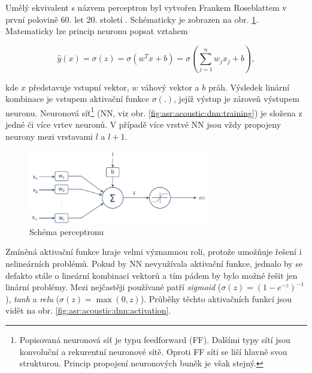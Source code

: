 Umělý ekvivalent s názvem perceptron byl vytvořen Frankem Roseblattem v první polovině 60. let 20. století \cite{Rosenblatt1962}. Schématicky je zobrazen na obr. \ref{fig:asr:acoustic:dnn:neuron:artificial}. Matematicky lze princip neuronu popsat vztahem

\begin{equation}
  \hat{y}\left(x\right) = \sigma\left(z\right) = \sigma \left(w^{T}x + b\right) = \sigma \left( \sum_{j=1}^{n} w_{j}x_{j} + b\right),
   \label{eq:asr:acoustic:dnn:neuron:output}
 \end{equation}

\noindent kde $x$ představuje vstupní vektor, $w$ váhový vektor a $b$ práh. Výsledek linární kombinace je vstupem aktivační funkce $\sigma\left(.\right)$, jejíž výstup je zároveň výstupem neuronu. Neuronová síť\footnote{Popisovaná neuronová síť je typu feedforward (FF). Dalšími typy sítí jsou konvoluční a rekurentní neuronové sítě. Oproti FF síti se liší hlavně svou strukturou. Princip propojení neuronových buněk je však stejný.} (NN, viz obr. \ref{fig:asr:acoustic:dnn:training}) je složena z jedné či více vrtev neuronů. V případě více vrstvé NN jsou vždy propojeny neurony mezi vrstavami $l$ a $l+1$.

\begin{figure}[hbpt]
  \centering
  \includegraphics[width=0.7\textwidth]{./ch4-asr/img/neuron.pdf}
  \caption{Schéma perceptronu}
  \label{fig:asr:acoustic:dnn:neuron:artificial}
\end{figure}

Zmíněná aktivační funkce hraje velmi významnou roli, protože umožňuje řešení i nelineárních problémů. Pokud by NN nevyužívala aktivační funkce, jednalo by se defakto stále o lineární kombinaci vektorů a tím pádem by bylo možné řešit jen linární problémy. Mezi nejčastěji používané patří \textit{sigmoid} ($\sigma\left(z\right) = \left(1 - e^{-z}\right)^{-1}$), \textit{tanh} a \textit{relu} ($\sigma\left(z\right) = \max\left(0, z\right)$). Průběhy těchto aktivačních funkcí jsou vidět na obr. \ref{fig:asr:acoustic:dnn:activation}.

